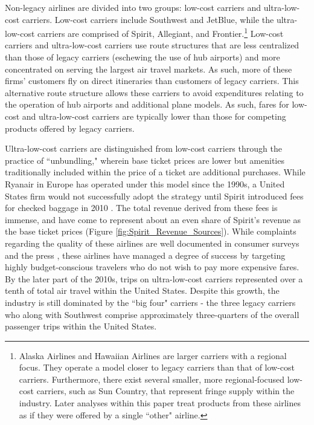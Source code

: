 \documentclass{article}
\begin{document}
	Non-legacy airlines are divided into two groups: low-cost carriers and ultra-low-cost carriers. Low-cost carriers include Southwest and JetBlue, while the ultra-low-cost carriers are comprised of Spirit, Allegiant, and Frontier.\footnote{Alaska Airlines and Hawaiian Airlines are larger carriers with a regional focus. They operate a model closer to legacy carriers than that of low-cost carriers. Furthermore, there exist several smaller, more regional-focused low-cost carriers, such as Sun Country, that represent fringe supply within the industry. Later analyses within this paper treat products from these airlines as if they were offered by a single ``other" airline.} Low-cost carriers and ultra-low-cost carriers use route structures that are less centralized than those of legacy carriers (eschewing the use of hub airports) and more concentrated on serving the largest air travel markets. As such, more of these firms' customers fly on direct itineraries than customers of legacy carriers. This alternative route structure allows these carriers to avoid expenditures relating to the operation of hub airports and additional plane models. As such, fares for low-cost and ultra-low-cost carriers are typically lower than those for competing products offered by legacy carriers.

	Ultra-low-cost carriers are distinguished from low-cost carriers through the practice of ``unbundling," wherein base ticket prices are lower but amenities traditionally included within the price of a ticket are additional purchases. While Ryanair in Europe has operated under this model since the 1990s, a United States firm would not successfully adopt the strategy until Spirit introduced fees for checked baggage in 2010 \citep{bachwich_emergence_2017}. The total revenue derived from these fees is immense, and have come to represent about an even share of Spirit's revenue as the base ticket prices (Figure \ref{fig:Spirit_Revenue_Sources}). While complaints regarding the quality of these airlines are well documented in consumer surveys and the press \citep{vasel_spirit_2016, elliott_jetblue_2022}, these airlines have managed a degree of success by targeting highly budget-conscious travelers who do not wish to pay more expensive fares. By the later part of the 2010s, trips on ultra-low-cost carriers represented over a tenth of total air travel within the United States.  Despite this growth, the industry is still dominated by the ``big four" carriers - the three legacy carriers who along with Southwest comprise approximately three-quarters of the overall passenger trips within the United States. 
\end{document}
